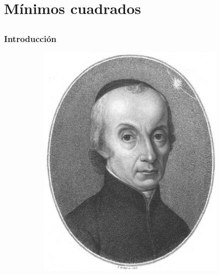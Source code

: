 \section{Mínimos cuadrados}

\subsection{}

{\nologo
\begin{frame}\frametitle{Introducción}


\begin{figure}
	\centering
	\begin{subfigure}[b]{0.27\textwidth}
		\includegraphics[width=\textwidth]{imagenes/Piazzi}
	\end{subfigure}
	\hspace{1.5cm}
	~ %
	\begin{subfigure}[b]{0.23\textwidth}

\end{subfigure}
\end{figure}
\end{frame}}
